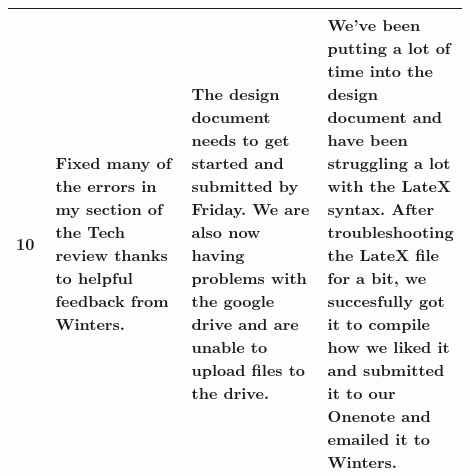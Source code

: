 \documentclass[onecolumn, draftclsnofoot,10pt, compsoc]{IEEEtran}
\begin{document}
\begin{singlespace}
\begin{tabular}{|l|p{0.3\linewidth}|p{0.3\linewidth}|p{0.3\linewidth}|}
		10 	& Fixed many of the errors in my section of the Tech review thanks to helpful feedback from Winters. & The design document needs to get started and submitted by Friday. We are also now having problems with the google drive and are unable to upload files to the drive. & We've been putting a lot of time into the design document and have been struggling a lot with the LateX syntax. After troubleshooting the LateX file for a bit, we succesfully got it to compile how we liked it and submitted it to our Onenote and emailed it to Winters. \\\hline
		\end{tabular}\\





\end{singlespace}
\end{document}
